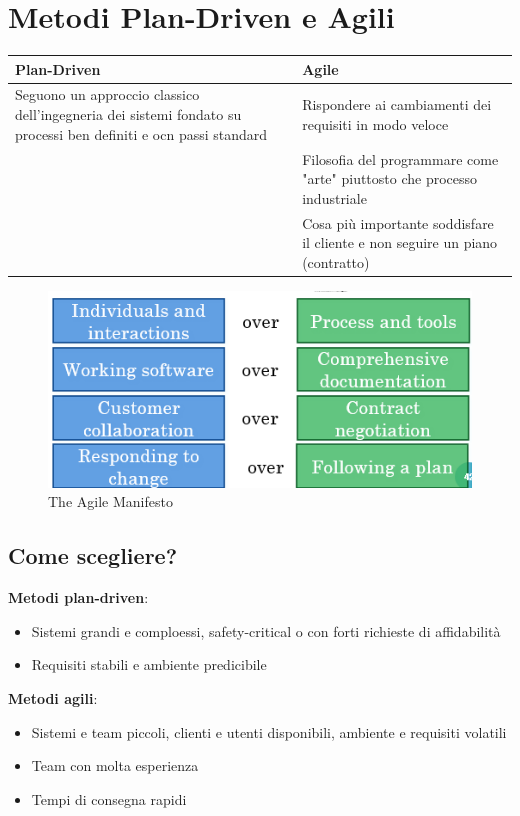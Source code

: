 \documentclass[12pt, a4paper]{report}
\begin{document}
\section{Metodi Plan-Driven e Agili}
\begin{center}
    \begin{tabular}{|p{}|p{}|}
        \hline
        \textbf{Plan-Driven} & \textbf{Agile} \\
        \hline
        Seguono un approccio classico dell'ingegneria dei sistemi fondato su processi ben definiti e ocn passi standard & Rispondere ai cambiamenti dei requisiti in modo veloce \\
        \hline
        & Filosofia del programmare come "arte" piuttosto che processo industriale \\
        \hline
        & Cosa più importante soddisfare il cliente e non seguire un piano (contratto)\\
        \hline
    \end{tabular}
\end{center}
\begin{figure}[h]
    \centering
    \includegraphics[width=0.5\linewidth]{Immagini/agilemanifesto.png}
    \caption{The Agile Manifesto}
\end{figure}
\subsection{Come scegliere?}
\textbf{Metodi plan-driven}: \begin{itemize}
    \item Sistemi grandi e comploessi, safety-critical o con forti richieste di affidabilità
    \item Requisiti stabili e ambiente predicibile
\end{itemize}
\textbf{Metodi agili}: \begin{itemize}
    \item Sistemi e team piccoli, clienti e utenti disponibili, ambiente e requisiti volatili
    \item Team con molta esperienza
    \item Tempi di consegna rapidi
\end{itemize}
\newpage
\end{document}

